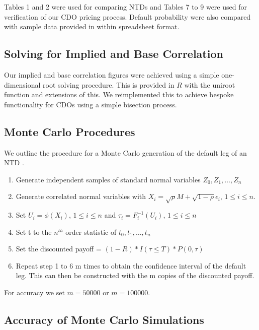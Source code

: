 Tables 1 and 2 were used for comparing NTDs and Tables 7 to 9 were used for verification of our CDO pricing process.  Default probability were also compared with sample data provided in \cite{lp2007} within spreadsheet format.



\subsection{Solving for Implied and Base Correlation}\label{subsec:impCorrSolve}

Our implied and base correlation figures were achieved using a simple one-dimensional
root solving procedure.  This is provided in $R$ with the uniroot function and extensions
of this.  We reimplemented this to achieve bespoke functionality for CDOs using a simple
bisection process.

\subsection{Monte Carlo Procedures}\label{subsec:monte}

We outline the procedure for a Monte Carlo generation of the default leg of 
an NTD \cite{Sch2003}.

\begin{enumerate}
\item Generate independent samples of standard normal variables $Z_0, Z_1, \ldots , Z_n$
\item Generate correlated normal variables with $X_i = \sqrt{ \rho } M + \sqrt{ 1 - \rho } \epsilon_i$, $1 \leq i \leq n$.
\item Set $U_i = \phi(X_i)$, $1 \leq i \leq n$ and $\tau_i = F_i^{-1} (U_i)$, $1 \leq i \leq n$
\item Set t to the $n^{th}$ order statistic of $t_0, t_1, \ldots , t_n$
\item Set the discounted payoff = $(1 - R) * I(\tau \leq T) * P(0, \tau)$
\item Repeat step 1 to 6 m times to obtain the confidence interval of the default leg. This can then be constructed with the m copies of the discounted payoff.
\end{enumerate}

For accuracy we set $m = 50000$ or $m = 100000$.
\smallskip

\subsection{Accuracy of Monte Carlo Simulations}\label{subsec:accuracy}


